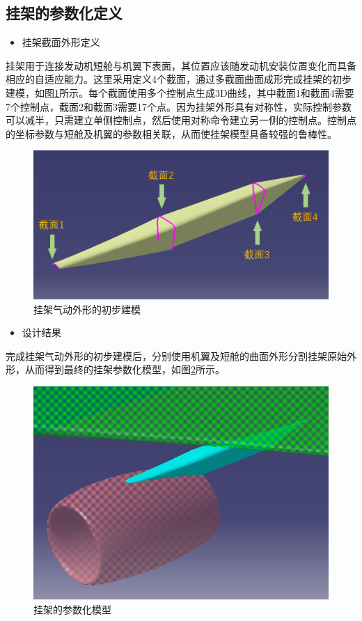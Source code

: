 \documentclass[12pt,a4paper]{report}
\begin{document}
\subsection{挂架的参数化定义}

\begin{itemize}
    \item[(1)] 挂架截面外形定义
\end{itemize}

挂架用于连接发动机短舱与机翼下表面，其位置应该随发动机安装位置变化而具备相应的自适应能力。这里采用定义4个截面，通过多截面曲面成形完成挂架的初步建模，如图\ref{fig:Pylon1}所示。每个截面使用多个控制点生成3D曲线，其中截面1和截面4需要7个控制点，截面2和截面3需要17个点。因为挂架外形具有对称性，实际控制参数可以减半，只需建立单侧控制点，然后使用对称命令建立另一侧的控制点。控制点的坐标参数与短舱及机翼的参数相关联，从而使挂架模型具备较强的鲁棒性。

\begin{figure}[hbt!]
\centering
\includegraphics[width=.8\textwidth]{Pylon1.PNG}
\caption{挂架气动外形的初步建模}
\label{fig:Pylon1}
\end{figure}

\begin{itemize}
    \item[(2)] 设计结果
\end{itemize}

完成挂架气动外形的初步建模后，分别使用机翼及短舱的曲面外形分割挂架原始外形，从而得到最终的挂架参数化模型，如图\ref{fig:Pylon2}所示。

\begin{figure}[hbt!]
\centering
\includegraphics[width=.8\textwidth]{Pylon2.PNG}
\caption{挂架的参数化模型}
\label{fig:Pylon2}
\end{figure}
\end{document}
